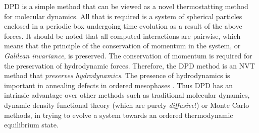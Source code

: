 DPD is a simple method that can be viewed as a novel thermostatting method for molecular
dynamics.  All that is required is a system of spherical particles enclosed in a periodic
box undergoing time evolution as a result of the above forces.  It should be noted that
all computed interactions are pairwise, which means that the principle of the conservation
of momentum in the system, or \emph{Galilean invariance}, is preserved.  The conservation
of momentum is required for the preservation of hydrodynamic forces.  Therefore, the DPD
method is an NVT method that \emph{preserves hydrodynamics}.  The presence of hydrodynamics
is important in annealing defects in ordered mesophases \cite{gonella-97a}.  Thus DPD has
an intrinsic advantage over other methods such as traditional molecular dynamics, dynamic
density functional theory (which are purely \emph{diffusive}!) or Monte Carlo methods, in
trying to evolve a system towards an ordered thermodynamic equilibrium state.
